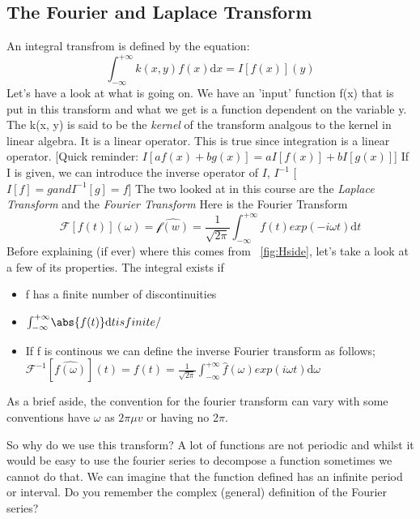 \subsection{The Fourier and Laplace Transform}
An integral transfrom is defined by the equation: 
\begin{equation}
\int_{-\infty}^{+\infty} \! k(x, y) f(x) \textrm{d}x = I[f(x)](y)
\end{equation}
Let's have a look at what is going on. We have an 'input' function f(x) that is put in this transform and what we get is a function dependent on the variable y. The k(x, y) is said to be the \textit{kernel} of the transform analgous to the kernel in linear algebra. It is a linear operator. This is true since integration is a linear operator. [Quick reminder: \begin{math} I[af(x) + bg(x)] = aI[f(x)] + bI[g(x)]\end{math}]
If I is given, we can introduce the inverse operator of $I$, $I^{-1}$ [\begin{math} I[f]=g and I^{-1}[g] = f\end{math}] 
The two looked at in this course are the \textit{Laplace Transform} and the \textit{Fourier Transform}
Here is the Fourier Transform
\begin{equation}
\mathcal{F}[f(t)](\omega) = \hat{\mathcal{f}(w)} = \frac{1}{\sqrt{2 \pi}} \int_{-\infty}^{+\infty} \! f(t) exp(-i\omega t) \textrm{d}t
\end{equation}
Before explaining (if ever) where this comes from ~\ref{fig:Hside}, let's take a look at a few of its properties.
The integral exists if
\begin{itemize}
\item f has a finite number of discontinuities
\item \begin{math} \int_{-\infty}^{+\infty} \! \abs{f(t)} \textrm{d}t is finite/\end{math}
\item If f is continous we can define the inverse Fourier transform as follows;
\begin{math} \mathcal{F}^{-1}[\hat{f(\omega)}](t) = f(t) = \frac{1}{\sqrt{2\pi}} \int_{-\infty}^{+\infty}\hat{f}(\omega)exp(i\omega t) \textrm{d}\omega
\end{math}
\end{itemize}
As a brief aside, the convention for the fourier transform can vary with some conventions have $\omega$ as $2\pi \mu v$ or having no 2$\pi$.\par
So why do we use this transform? A lot of functions are not periodic and whilst it would be easy to use the fourier series to decompose a function sometimes we cannot do that. We can imagine that the function defined has an infinite period or interval. Do you remember the complex (general) definition of the Fourier series?